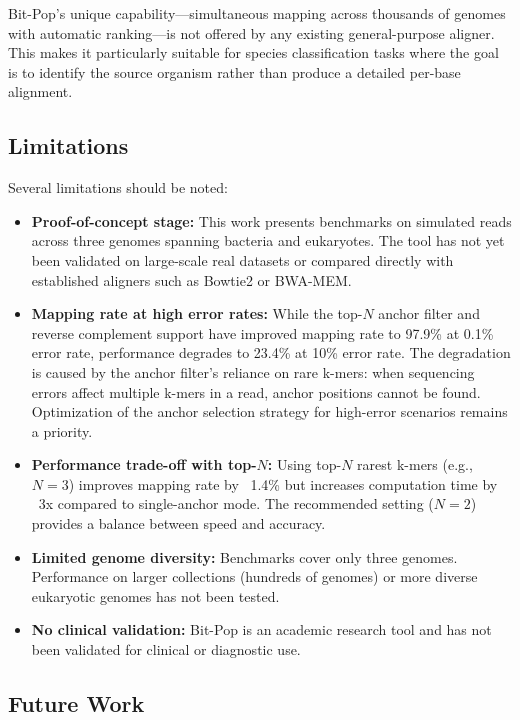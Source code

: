 \documentclass[utf8]{article}
\begin{document}
Bit-Pop's unique capability---simultaneous mapping across thousands of genomes with automatic ranking---is not offered by any existing general-purpose aligner. This makes it particularly suitable for species classification tasks where the goal is to identify the source organism rather than produce a detailed per-base alignment.

\subsection{Limitations}

Several limitations should be noted:
\begin{itemize}
\item \textbf{Proof-of-concept stage:} This work presents benchmarks on simulated reads across three genomes spanning bacteria and eukaryotes. The tool has not yet been validated on large-scale real datasets or compared directly with established aligners such as Bowtie2 or BWA-MEM.
\item \textbf{Mapping rate at high error rates:} While the top-$N$ anchor filter and reverse complement support have improved mapping rate to 97.9\% at 0.1\% error rate, performance degrades to 23.4\% at 10\% error rate. The degradation is caused by the anchor filter's reliance on rare k-mers: when sequencing errors affect multiple k-mers in a read, anchor positions cannot be found. Optimization of the anchor selection strategy for high-error scenarios remains a priority.
\item \textbf{Performance trade-off with top-$N$:} Using top-$N$ rarest k-mers (e.g., $N=3$) improves mapping rate by ~1.4\% but increases computation time by ~3x compared to single-anchor mode. The recommended setting ($N=2$) provides a balance between speed and accuracy.
\item \textbf{Limited genome diversity:} Benchmarks cover only three genomes. Performance on larger collections (hundreds of genomes) or more diverse eukaryotic genomes has not been tested.
    \item \textbf{No clinical validation:} Bit-Pop is an academic research tool and has not been validated for clinical or diagnostic use.
\end{itemize}

\subsection{Future Work}
\end{document}
